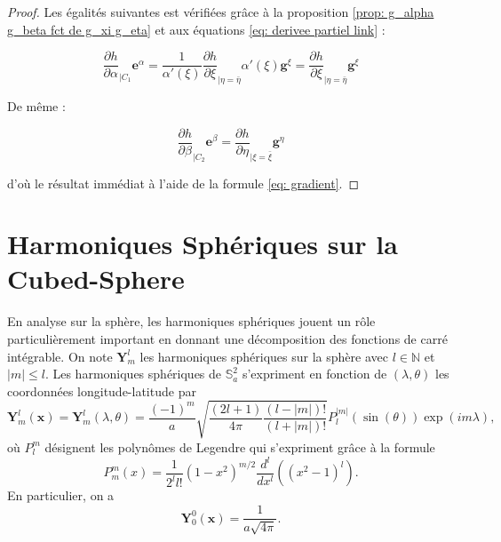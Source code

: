 \begin{proof}
Les égalités suivantes est vérifiées grâce à la proposition \ref{prop: g_alpha g_beta fct de g_xi g_eta} et aux équations \eqref{eq: derivee partiel link} :

\begin{equation}
\dfrac{\partial h}{\partial \alpha}_{|C_1} \mathbf{e}^{\alpha} = \dfrac{1}{\alpha'(\xi)} \dfrac{\partial h}{\partial \xi}_{|\eta = \bar{\eta}} \alpha'(\xi) \mathbf{g}^{\xi} = \dfrac{\partial h}{\partial \xi}_{|\eta = \bar{\eta}} \mathbf{g}^{\xi}
\end{equation}

De même :

\begin{equation}
\dfrac{\partial h}{\partial \beta}_{|C_2} \mathbf{e}^{\beta} =  \dfrac{\partial h}{\partial \eta}_{|\xi = \bar{\xi}} \mathbf{g}^{\eta}
\end{equation}

d'où le résultat immédiat à l'aide de la formule \eqref{eq: gradient}.
\end{proof}































\section{Harmoniques Sphériques sur la Cubed-Sphere}

En analyse sur la sphère, les harmoniques sphériques jouent un rôle particulièrement important \cite{Atkinson2012, Frye2012} en donnant une décomposition des fonctions de carré intégrable. On note $\mathbf{Y}^l_m$ les harmoniques sphériques sur la sphère avec $l \in \mathbb{N}$ et $|m| \leq l$. Les harmoniques sphériques de $\mathbb{S}_a^2$ s'expriment en fonction de $(\lambda, \theta)$ les coordonnées longitude-latitude par
\begin{equation}
\mathbf{Y}_m^l(\mathbf{x}) = \mathbf{Y}_m^l(\lambda, \theta) = \dfrac{(-1)^m}{a} \sqrt{\dfrac{(2l+1)}{4 \pi} \dfrac{(l-|m|)!}{(l+|m|)!}} P^{|m|}_l (\sin (\theta)) \exp \left( i m \lambda \right),
\label{eq:harmoniques_spheriques}
\end{equation}
où $P^m_l$ désignent les polynômes de Legendre \cite{Lagrange1939} qui s'expriment grâce à la formule
\begin{equation}
P^m_m(x) = \dfrac{1}{2^l l!}(1-x^2)^{m/2} \dfrac{d^l}{dx^l} \left( (x^2-1)^l \right).
\end{equation}
En particulier, on a 
\begin{equation}
\mathbf{Y}_0^0(\mathbf{x}) = \dfrac{1}{a \sqrt{4 \pi}}.
\end{equation}

